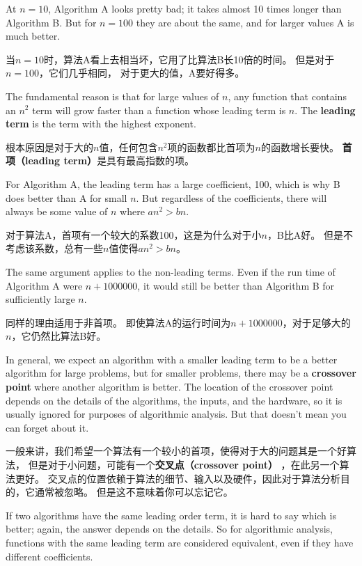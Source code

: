 \documentclass[10pt]{book}
\begin{document}
\begin{CJK}{UTF8}{gbsn}
At $n=10$, Algorithm A looks pretty bad; it takes almost 10 times
longer than Algorithm B.  But for $n=100$ they are about the same, and
for larger values A is much better.

当$n=10$时，算法A看上去相当坏，它用了比算法B长10倍的时间。
但是对于$n=100$，它们几乎相同，
对于更大的值，A要好得多。

The fundamental reason is that for large values of $n$, any function
that contains an $n^2$ term will grow faster than a function whose
leading term is $n$.  The {\bf leading term} is the term with the
highest exponent.

根本原因是对于大的$n$值，任何包含$n^2$项的函数都比首项为$n$的函数增长要快。
{\bf 首项（leading term）}是具有最高指数的项。

For Algorithm A, the leading term has a large coefficient, 100, which
is why B does better than A for small $n$.  But regardless of the
coefficients, there will always be some value of $n$ where
$a n^2 > b n$.

对于算法A，首项有一个较大的系数100，这是为什么对于小$n$，B比A好。
但是不考虑该系数，总有一些$n$值使得$a n^2 > b n$。

The same argument applies to the non-leading terms.  Even if the run
time of Algorithm A were $n+1000000$, it would still be better than
Algorithm B for sufficiently large $n$.

同样的理由适用于非首项。
即使算法A的运行时间为$n+1000000$，对于足够大的$n$，它仍然比算法B好。

In general, we expect an algorithm with a smaller leading term to be a
better algorithm for large problems, but for smaller problems, there
may be a {\bf crossover point} where another algorithm is better.  The
location of the crossover point depends on the details of the
algorithms, the inputs, and the hardware, so it is usually ignored for
purposes of algorithmic analysis.  But that doesn't mean you can forget
about it.

一般来讲，我们希望一个算法有一个较小的首项，使得对于大的问题其是一个好算法，
但是对于小问题，可能有一个{\bf 交叉点（crossover point）} ，在此另一个算法更好。
交叉点的位置依赖于算法的细节、输入以及硬件，因此对于算法分析目的，它通常被忽略。
但是这不意味着你可以忘记它。

If two algorithms have the same leading order term, it is hard to say
which is better; again, the answer depends on the details.  So for
algorithmic analysis, functions with the same leading term
are considered equivalent, even if they have different coefficients.


\end{CJK}
\end{document}
